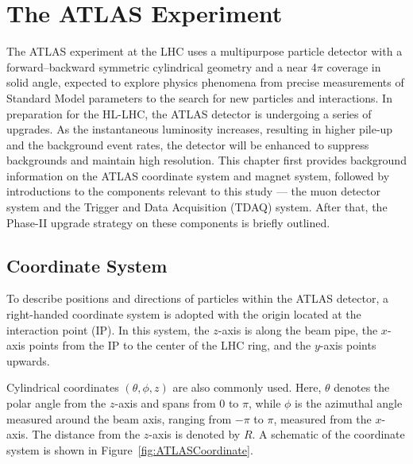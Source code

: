 \chapter{The ATLAS Experiment} \label{ch:ATLAS} 
The ATLAS experiment at the LHC uses a multipurpose particle detector with a forward–backward symmetric cylindrical geometry and a near 4$\pi$ coverage in solid angle, expected to explore physics phenomena from precise measurements of Standard Model parameters to the search for new particles and interactions. In preparation for the HL-LHC, the ATLAS detector is undergoing a series of upgrades. As the instantaneous luminosity increases, resulting in higher pile-up and the background event rates, the detector will be enhanced to suppress backgrounds and maintain high resolution. This chapter first provides background information on the ATLAS coordinate system and magnet system, followed by introductions to the components relevant to this study --- the muon detector system and the Trigger and Data Acquisition (TDAQ) system. After that, the Phase-II upgrade strategy on these components is briefly outlined.
\section{Coordinate System} \label{sec:CoordinateSystem}
To describe positions and directions of particles within the ATLAS detector, a right-handed coordinate system is adopted with the origin located at the interaction point (IP). In this system, the \(z\)-axis is along the beam pipe, the \(x\)-axis points from the IP to the center of the LHC ring, and the \(y\)-axis points upwards.

Cylindrical coordinates \((\theta, \phi, z)\) are also commonly used. Here, \(\theta\) denotes the polar angle from the \(z\)-axis and spans from \(0\) to \(\pi\), while \(\phi\) is the azimuthal angle measured around the beam axis, ranging from \(-\pi\) to \(\pi\), measured from the \(x\)-axis. The distance from the \(z\)-axis is denoted by \(R\). A schematic of the coordinate system is shown in Figure~\ref{fig:ATLASCoordinate}.

